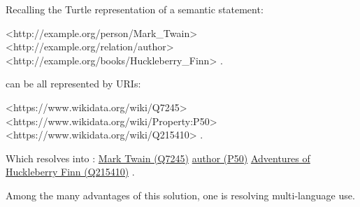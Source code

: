 \documentclass[
  letterpaper,
  DIV=11,
  numbers=noendperiod]{scrreprt}
\newenvironment{Shaded}{\begin{snugshade}}{\end{snugshade}}
\newcommand{\ErrorTok}[1]{\textcolor[rgb]{0.68,0.00,0.00}{#1}}
\newcommand{\NormalTok}[1]{\textcolor[rgb]{0.00,0.23,0.31}{#1}}
\newcommand{\SpecialCharTok}[1]{\textcolor[rgb]{0.37,0.37,0.37}{#1}}
\begin{document}
Recalling the Turtle representation of a semantic statement:

\begin{Shaded}
\begin{Highlighting}[]
\SpecialCharTok{\textless{}}\NormalTok{http}\SpecialCharTok{:}\ErrorTok{//}\NormalTok{example.org}\SpecialCharTok{/}\NormalTok{person}\SpecialCharTok{/}\NormalTok{Mark\_Twain}\SpecialCharTok{\textgreater{}}
   \ErrorTok{\textless{}}\NormalTok{http}\SpecialCharTok{:}\ErrorTok{//}\NormalTok{example.org}\SpecialCharTok{/}\NormalTok{relation}\SpecialCharTok{/}\NormalTok{author}\SpecialCharTok{\textgreater{}}
   \ErrorTok{\textless{}}\NormalTok{http}\SpecialCharTok{:}\ErrorTok{//}\NormalTok{example.org}\SpecialCharTok{/}\NormalTok{books}\SpecialCharTok{/}\NormalTok{Huckleberry\_Finn}\SpecialCharTok{\textgreater{}}\NormalTok{ .}
\end{Highlighting}
\end{Shaded}

can be all represented by URIs:

\begin{Shaded}
\begin{Highlighting}[]
\SpecialCharTok{\textless{}}\NormalTok{https}\SpecialCharTok{:}\ErrorTok{//}\NormalTok{www.wikidata.org}\SpecialCharTok{/}\NormalTok{wiki}\SpecialCharTok{/}\NormalTok{Q7245}\SpecialCharTok{\textgreater{}}
   \ErrorTok{\textless{}}\NormalTok{https}\SpecialCharTok{:}\ErrorTok{//}\NormalTok{www.wikidata.org}\SpecialCharTok{/}\NormalTok{wiki}\SpecialCharTok{/}\NormalTok{Property}\SpecialCharTok{:}\NormalTok{P50}\SpecialCharTok{\textgreater{}}
   \ErrorTok{\textless{}}\NormalTok{https}\SpecialCharTok{:}\ErrorTok{//}\NormalTok{www.wikidata.org}\SpecialCharTok{/}\NormalTok{wiki}\SpecialCharTok{/}\NormalTok{Q215410}\SpecialCharTok{\textgreater{}}\NormalTok{ .}
\end{Highlighting}
\end{Shaded}

Which resolves into : \href{https://www.wikidata.org/wiki/Q7245}{Mark
Twain (Q7245)} \href{https://www.wikidata.org/wiki/Property:P50}{author
(P50)} \href{https://www.wikidata.org/wiki/Q215410}{Adventures of
Huckleberry Finn (Q215410)} .

Among the many advantages of this solution, one is resolving
multi-language use.
\end{document}
